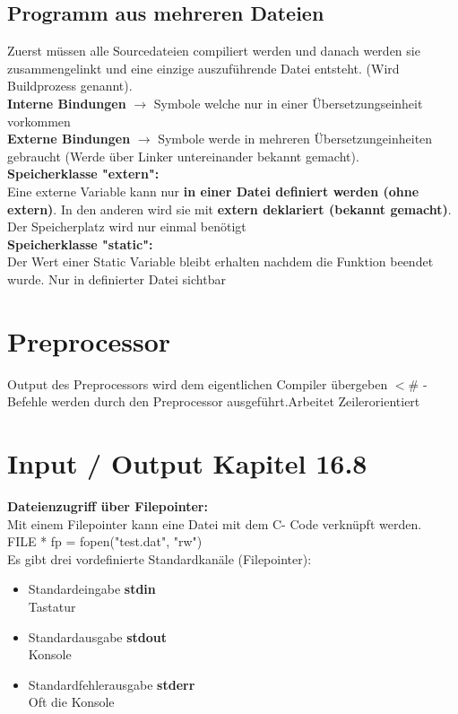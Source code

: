 \documentclass{article}
\begin{document}
\subsection{Programm aus mehreren Dateien}
Zuerst müssen alle Sourcedateien compiliert werden und danach werden sie zusammengelinkt und eine einzige auszuführende Datei entsteht. (Wird Buildprozess genannt). \\
\textbf{Interne Bindungen} $\rightarrow$ Symbole welche nur in einer Übersetzungseinheit vorkommen \\
\textbf{Externe Bindungen} $\rightarrow$ Symbole werde in mehreren Übersetzungeinheiten gebraucht (Werde über Linker untereinander bekannt gemacht). \\
\textbf{Speicherklasse "extern":} \\
Eine externe Variable kann nur \textbf{in einer Datei definiert werden (ohne extern)}. In den anderen wird sie mit \textbf{extern deklariert (bekannt gemacht)}. \\ 
Der Speicherplatz wird nur einmal benötigt \\
\textbf{Speicherklasse "static":} \\
Der Wert einer Static Variable bleibt erhalten nachdem die Funktion beendet wurde. Nur in definierter Datei sichtbar
\section{Preprocessor}
Output des Preprocessors wird dem eigentlichen Compiler übergeben
$<\#$ - Befehle werden durch den Preprocessor ausgeführt.Arbeitet Zeilerorientiert
\section{Input / Output Kapitel 16.8}
\textbf{Dateienzugriff über Filepointer:} \\
Mit einem Filepointer kann eine Datei mit dem C- Code verknüpft werden.\\
FILE * fp = fopen("test.dat", "rw") \\
Es gibt drei vordefinierte Standardkanäle (Filepointer): 
\begin{itemize}
    \item Standardeingabe \textbf{stdin} \\
    Tastatur
    \item Standardausgabe \textbf{stdout} \\
    Konsole
    \item Standardfehlerausgabe \textbf{stderr} \\
    Oft die Konsole
\end{itemize}
\end{document}
